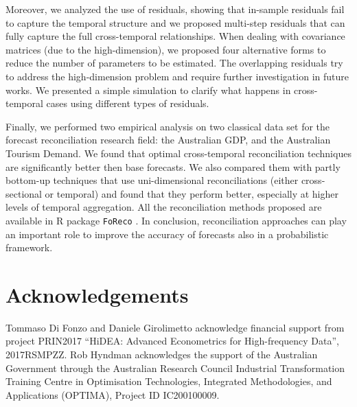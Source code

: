 \documentclass[a4paper,11pt]{article}
\theoremstyle{definition}
\begin{document}
Moreover, we analyzed the use of residuals, showing that in-sample residuals fail to capture the temporal structure and we proposed multi-step residuals that can fully capture the full cross-temporal relationships. When dealing with covariance matrices (due to the high-dimension), we proposed four alternative forms to reduce the number of parameters to be estimated. The overlapping residuals try to address the high-dimension problem and require further investigation in future works. We presented a simple simulation to clarify what happens in cross-temporal cases using different types of residuals.%

Finally, we performed two empirical analysis on two classical data set for the forecast reconciliation research field: the Australian GDP, and the Australian Tourism Demand. We found that optimal cross-temporal reconciliation techniques are significantly better then base forecasts. We also compared them with partly bottom-up techniques that use uni-dimensional reconciliations (either cross-sectional or temporal) and found that they perform better, especially at higher levels of temporal aggregation. All the reconciliation methods proposed are available in \textsf{R} package \texttt{FoReco} \citep{girolimetto2022}. In conclusion, reconciliation approaches can play an important role to improve the accuracy of forecasts also in a probabilistic framework.

\section*{Acknowledgements}
\noindent Tommaso Di Fonzo and Daniele Girolimetto acknowledge financial support from project PRIN2017 “HiDEA: Advanced Econometrics for High-frequency Data”, 2017RSMPZZ. Rob Hyndman acknowledges the support of the Australian Government through the Australian Research Council Industrial Transformation Training Centre in Optimisation Technologies, Integrated Methodologies, and Applications (OPTIMA), Project ID IC200100009.





\clearpage

\appendix
\setcounter{table}{0}
\renewcommand{\thetable}{\Alph{section}.\arabic{table}}
%
\end{document}
